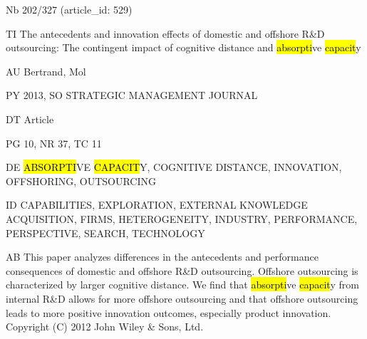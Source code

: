 \documentclass[a4paper]{article}
\begin{document}
\vspace*{-2cm}
Nb \tabto{0cm}202/327 (article\_id: 529)\par
TI \tabto{0cm}The antecedents and innovation effects of domestic and offshore R\&D outsourcing: The contingent impact of cognitive distance and \hl{absorpti}ve \hl{capacit}y\par
AU \tabto{0cm}Bertrand, Mol\par
PY \tabto{0cm}2013, SO STRATEGIC MANAGEMENT JOURNAL\par
DT \tabto{0cm}Article\par
PG \tabto{0cm}10, NR 37, TC 11\par
DE \tabto{0cm}\hl{ABSORPTI}VE \hl{CAPACIT}Y, COGNITIVE DISTANCE, INNOVATION, OFFSHORING, OUTSOURCING\par
ID \tabto{0cm}CAPABILITIES, EXPLORATION, EXTERNAL KNOWLEDGE ACQUISITION, FIRMS, HETEROGENEITY, INDUSTRY, PERFORMANCE, PERSPECTIVE, SEARCH, TECHNOLOGY\par
AB \tabto{0cm}This paper analyzes differences in the antecedents and performance consequences of domestic and offshore R\&D outsourcing. Offshore outsourcing is characterized by larger cognitive distance. We find that \hl{absorpti}ve \hl{capacit}y from internal R\&D allows for more offshore outsourcing and that offshore outsourcing leads to more positive innovation outcomes, especially product innovation. Copyright (C) 2012 John Wiley \& Sons, Ltd.\par
\clearpage
\end{document}
